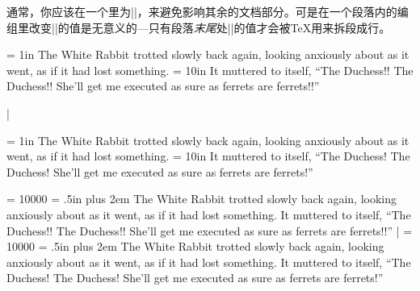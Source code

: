 通常，你应该在一个里为|\leftskip|，来避免影响其余的文档部分。可是在一个段落内的编组里改变|\leftskip|的值是无意义的---只有段落\emph{末尾}处|\leftskip|的值才会被\TeX{}用来拆段成行。

\example
{\leftskip = 1in The White Rabbit trotted slowly back
again, looking anxiously about as it went, as if it had
lost something.  {\leftskip = 10in %
It muttered to itself, ``The Duchess!! The Duchess!! She'll
get me executed as sure as ferrets are ferrets!!''}\par}%
|
\produces
{\leftskip = 1in The White Rabbit trotted slowly back
again, looking anxiously about as it went, as if it had
lost something.  {\leftskip = 10in %
It muttered to itself, ``The Duchess! The Duchess!
She'll get me executed as sure as ferrets are ferrets!''}\par}%
\nextexample
\pretolerance = 10000 %
\rightskip = .5in plus 2em
The White Rabbit trotted slowly back again, looking
anxiously about as it went, as if it had lost something.
It muttered to itself, ``The Duchess!! The Duchess!! She'll
get me executed as sure as ferrets are ferrets!!''
|
\produces
\pretolerance = 10000 %
\rightskip = .5in plus 2em
The White Rabbit trotted slowly back again, looking
anxiously about as it went, as if it had lost something.
It muttered to itself, ``The Duchess! The Duchess! She'll
get me executed as sure as ferrets are ferrets!''
\endexample
\enddesc



